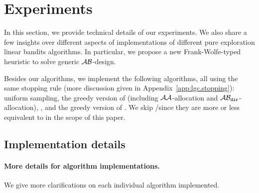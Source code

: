 
\section{Experiments}\label{sec:lgc.experiments}

In this section, we provide technical details of our experiments. We also share a few insights over different aspects of implementations of different pure exploration linear bandits algorithms. In particular, we propose a new Frank-Wolfe-typed heuristic to solve generic $\mathcal{A}\mathcal{B}$-design.

Besides our algorithms, we implement the following algorithms, all using the same stopping rule (more discussion given in Appendix~\ref{app:lgc.stopping}): uniform sampling, the greedy version of \XYS (including $\mathcal{A}\mathcal{A}$-allocation and $\mathcal{A}\mathcal{B}_{\texttt{dir}}$-allocation), \XYA, and the greedy version of \LGapE. We skip \GLUCB/\GLGapE since they are more or less equivalent to \LGapE in the scope of this paper.

\subsection{Implementation details}\label{sec:lgc.experiments.implem}

\paragraph{More details for algorithm implementations.} We give more clarifications on each individual algorithm implemented.

